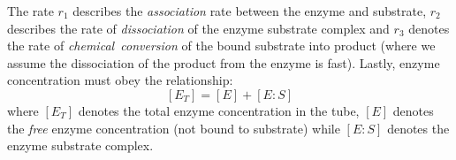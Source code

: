 \documentclass[11pt]{article}
\theoremstyle{definition}
\begin{document}
The rate $r_{1}$ describes the \emph{association} rate between the enzyme and substrate, $r_{2}$ describes the rate of \emph{dissociation} of the enzyme substrate complex and $r_{3}$ denotes the rate of \emph{chemical~conversion} of the bound substrate into product (where we assume the dissociation of the product from the enzyme is fast). Lastly, enzyme concentration must obey the relationship:
\begin{equation}\label{eqn:total-enzyme-balance-simple}
	\left[E_{T}\right] = \left[E\right] + \left[E:S\right]
\end{equation}where $\left[E_{T}\right]$ denotes the total enzyme concentration in the tube, $\left[E\right]$ denotes the \emph{free} enzyme concentration (not bound to substrate) while
$\left[E:S\right]$ denotes the enzyme substrate complex.
\end{document}
